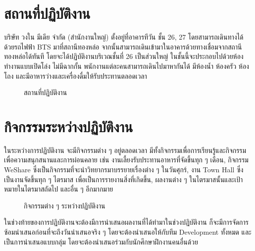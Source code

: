 \chapter{สถานที่ปฏิบัติงาน}
บริษัท วงใน มีเดีย จำกัด (สำนักงานใหญ่) ตั้งอยู่ที่อาคารทีวัน ชั้น 26, 27 โดยสามารถเดินทางได้ด้วยรถไฟฟ้า BTS มาที่สถานีทองหล่อ จากนั้นสามารถเดินเข้ามาในอาคารด้วยทางเชื่อมจากสถานีทองหล่อได้ทันที โดยจะได้ปฏิบัติงานบริเวณชั้นที่ 26 เป็นส่วนใหญ่ ในชั้นนี้จะประกอบไปด้วยห้องทำงานแบบเปิดโล่ง ไม่มีฉากกั้น พนักงานแต่ละคนสามารถเดินไปมาหากันได้ มีห้องน้ำ ห้องครัว ห้องโถง และมีอาหารว่างและเครื่องดื่มให้รับประทานตลอดเวลา

\begin{figure}[!h]
	\centering
	\caption{สถานที่ปฏิบัติงาน}
	\label{Fig:workspace}
\end{figure}

\chapter{กิจกรรมระหว่างปฏิบัติงาน}
ในระหว่างการปฏิบัติงาน จะมีกิจกรรมต่าง ๆ อยู่ตลอดเวลา มีทั้งกิจกรรมเพื่อการเรียนรู้และกิจกรรมเพื่อความสนุกสนานและการผ่อนคลาย เช่น 
งานเลี้ยงรับประทานอาหารที่จัดขึ้นทุก ๆ เดือน, กิจกรรม WeShare ซึ่งเป็นกิจกรรมที่จะนำวิทยากรมาบรรยายเรื่องต่าง ๆ ในวันศุกร์, งาน Town Hall ซึ่ง เป็นงานจัดขึ้นทุก ๆ ไตรมาส เพื่อเป็นการรายงานสิ่งที่เกิดขึ้น, ผลงานต่าง ๆ ในไตรมาสนั้นและเป้าหมายในไตรมาสถัดไป และอื่น ๆ อีกมากมาย

\begin{figure}[!h]
	\centering
	\caption{กิจกรรมต่าง ๆ ระหว่างปฏิบัติงาน}
	\label{Fig:event1}
\end{figure}

ในช่วงท้ายของการปฏิบัติงานจะต้องมีการนำเสนอผลงานที่ได้ทำมาในช่วงปฏิบัติงาน ก็จะมีการจัดการซ้อมนำเสนอก่อนที่จะถึงวันนำเสนอจริง ๆ โดยจะต้องนำเสนอให้กับทีม Development ทั้งหมด และเป็นการนำเสนอแบบกลุ่ม โดยจะต้องนำเสนอร่วมกับนักศึกษาฝึกงานคนอื่นด้วย

